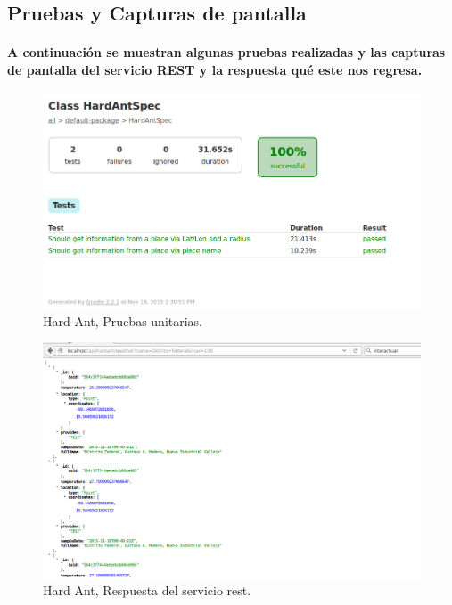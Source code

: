   \subsection{Pruebas y Capturas de pantalla}
    \paragraph{A continuación se muestran algunas pruebas realizadas y las capturas de pantalla del servicio REST y la respuesta qué este nos regresa.}
      \begin{figure}[h!]
        \centering
          \includegraphics[width=\textwidth]{./images/PruebasHardAnt}
          \caption{Hard Ant, Pruebas unitarias.}
      \end{figure}
      \begin{figure}[h!]
        \centering
          \includegraphics[width=\textwidth]{./images/CapturaHardAnt}
          \caption{Hard Ant, Respuesta del servicio rest.}
      \end{figure}